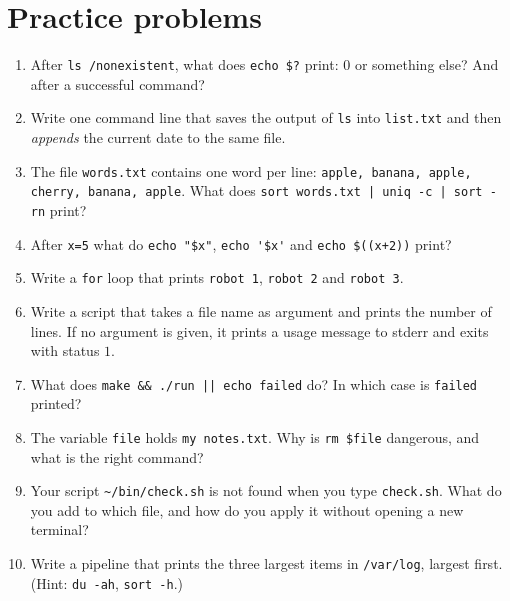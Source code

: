 \section*{Practice problems}
\begin{enumerate}[label=\textbf{\thechapter.\arabic*}]
  \item After \verb|ls /nonexistent|, what does \verb|echo $?| print: $0$ or something else? And after a successful command?
  \item Write one command line that saves the output of \texttt{ls} into \texttt{list.txt} and then \emph{appends} the current date to the same file.
  \item The file \texttt{words.txt} contains one word per line: \texttt{apple, banana, apple, cherry, banana, apple}. What does \verb/sort words.txt | uniq -c | sort -rn/ print?
  \item After \verb|x=5| what do \verb|echo "$x"|, \verb|echo '$x'| and \verb|echo $((x+2))| print?
  \item Write a \texttt{for} loop that prints \texttt{robot 1}, \texttt{robot 2} and \texttt{robot 3}.
  \item Write a script that takes a file name as argument and prints the number of lines. If no argument is given, it prints a usage message to stderr and exits with status $1$.
  \item What does \verb!make && ./run || echo failed! do? In which case is \texttt{failed} printed?
  \item The variable \texttt{file} holds \texttt{my notes.txt}. Why is \verb|rm $file| dangerous, and what is the right command?
  \item Your script \texttt{\textasciitilde/bin/check.sh} is not found when you type \texttt{check.sh}. What do you add to which file, and how do you apply it without opening a new terminal?
  \item[\textbf{\thechapter.10}$\star$] Write a pipeline that prints the three largest items in \texttt{/var/log}, largest first. (Hint: \verb|du -ah|, \verb|sort -h|.)
\end{enumerate}
